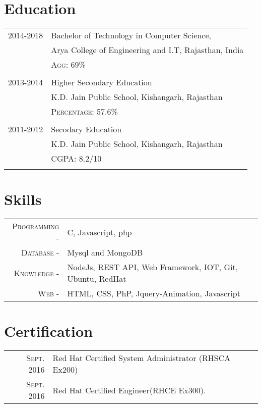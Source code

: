 \documentclass[a4paper,10pt]{article}
\begin{document}
\section{Education}
\begin{tabular}{rl}	
 \textsc 2014-2018 & Bachelor of Technology in Computer Science, \\
& Arya College of Engineering and I.T, Rajasthan, India\\

&\normalsize \textsc{Agg}: 69\% \\&\\
\textsc 2013-2014& Higher Secondary Education  \\&K.D. Jain Public School, Kishangarh, Rajasthan\\

&\normalsize \textsc{Percentage}: 57.6\% \\&\\
\textsc2011-2012& Secodary Education\\
& K.D. Jain Public School, Kishangarh, Rajasthan\\

&\textsc{CGPA}: 8.2/10 \\&\\

\end{tabular}

\section{Skills}
\begin{tabular}{rl}
 \textsc {Programming -} & C, Javascript, php\\
  \textsc {Database -} & Mysql and MongoDB \\
 \textsc {Knowledge -} & NodeJs, REST API, Web Framework, IOT, Git, Ubuntu, RedHat\\

 \textsc {Web -} & HTML, CSS, PhP, Jquery-Animation, Javascript \\
 

\end{tabular}

\section{Certification}
\begin{tabular}{rl}
 \textsc{Sept.} 2016 & Red Hat Certified System Administrator (RHSCA Ex200)\\
\textsc{Sept.} 2016 & Red Hat Certified Engineer(RHCE Ex300). 
\end{tabular}
\end{document}
